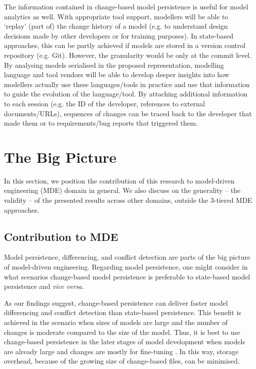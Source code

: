 The information contained in change-based model persistence is useful for model analytics as well. With appropriate tool support, modellers will be able to ‘replay’ (part of) the change history of a model (e.g. to understand design decisions made by other developers or for training purposes). In state-based approaches, this can be partly achieved if models are stored in a version control repository (e.g. Git). However, the granularity would be only at the commit level. By analysing models serialised in the proposed representation, modelling language and tool vendors will be able to develop deeper insights into how modellers actually use these languages/tools in practice and use that information to guide the evolution of the language/tool. By attaching additional information to each session (e.g. the ID of the developer, references to external documents/URLs), sequences of changes can be traced back to the developer that made them or to requirements/bug reports that triggered them.

\section{The Big Picture}
\label{sec:the_big_picture}
In this section, we position the contribution of this research to model-driven engineering (MDE) domain in general. We also discuss on the generality -- the validity -- of the presented results across other domains, outside the 3-tiered MDE approaches.

\subsection{Contribution to MDE}
\label{sec:contribution_to_mde}
Model persistence, differencing, and conflict detection are parts of the big picture of model-driven engineering. Regarding model persistence, one might consider in what scenarios change-based model persistence is preferable to state-based model persistence and \emph{vice versa}.

As our findings suggest, change-based persistence can deliver faster model differencing and conflict detection than state-based persistence. This benefit is achieved in the scenario when sizes of models are large and the number of changes is moderate compared to the size of the model. Thus, it is best to use change-based persistence in the later stages of model development when models are already large and changes are mostly for fine-tuning \cite{selic2003pragmatics}. In this way, storage overhead, because of the growing size of change-based files, can be minimised.

